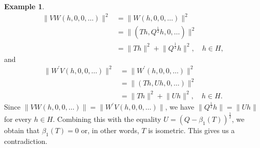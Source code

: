 \documentclass{amsart}
\theoremstyle{definition}
\newtheorem{example}[theorem]{Example}
\numberwithin{equation}{section}
\begin{document}
\begin{example}
    \begin{align*}
        \lVert VW(h,0,0,\ldots)\rVert^{2} &= \lVert W(h,0,0,\ldots)\rVert^{2} \\
        &=\lVert (Th,Q^{\frac{1}{2}}h,0,\ldots)\rVert^{2} \\
        &= \lVert Th\rVert^{2} + \lVert Q^{\frac{1}{2}}h\rVert^{2}, \quad h\in H,
    \end{align*}
    and
    \begin{align*}
        \lVert W^{\prime} V(h,0,0,\ldots)\rVert^{2} &= \lVert W^{\prime}(h,0,0,\ldots)\rVert^{2}\\
        &= \lVert (Th,Uh,0,\ldots)\rVert^{2} \\
        &= \lVert Th\rVert^{2}+\lVert Uh\rVert^{2}, \quad h\in H.
    \end{align*}
    Since $ \lVert VW(h,0,0,\ldots)\rVert = \lVert W^{\prime} V(h,0,0,\ldots)\rVert $, we have $ \lVert Q^{\frac{1}{2}}h\rVert = \lVert Uh\rVert $ for every $ h\in H $. Combining this with the equality $ U = (Q-\beta_{1}(T))^{\frac{1}{2}} $, we obtain that $ \beta_{1}(T) = 0 $ or, in other words, $ T $ is isometric. This gives us a contradiction.
\end{example}
	
	
\end{document}
